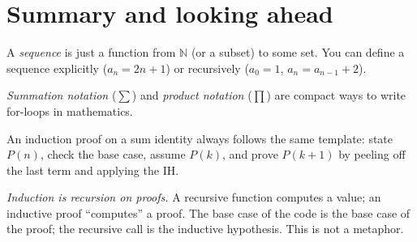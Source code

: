 \documentclass[11pt]{article}
\begin{document}
\section{Summary and looking ahead}

\begin{keytakeaway}
  \item A \emph{sequence} is just a function from $\mathbb{N}$ (or a subset) to some set. You can define a sequence explicitly ($a_n = 2n+1$) or recursively ($a_0 = 1$, $a_n = a_{n-1} + 2$).
  \item \emph{Summation notation} ($\sum$) and \emph{product notation} ($\prod$) are compact ways to write for-loops in mathematics.
  \item An induction proof on a sum identity always follows the same template: state $P(n)$, check the base case, assume $P(k)$, and prove $P(k+1)$ by peeling off the last term and applying the IH.
  \item \emph{Induction is recursion on proofs.} A recursive function computes a value; an inductive proof ``computes'' a proof. The base case of the code is the base case of the proof; the recursive call is the inductive hypothesis. This is not a metaphor.
\end{keytakeaway}
\end{document}
